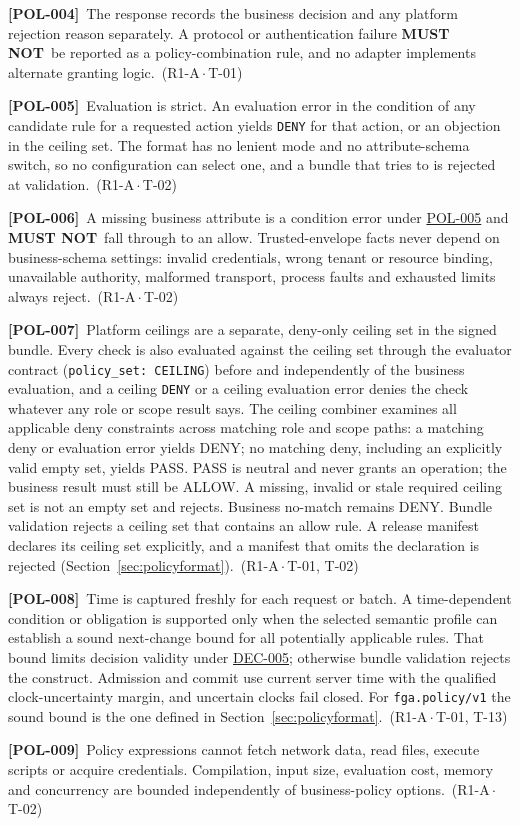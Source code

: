 \documentclass[11pt,a4paper]{article}
\newcommand{\mustnot}{\textbf{MUST NOT}}
\newcommand{\code}[1]{{\small\nolinkurl{#1}}}
\newcommand{\rr}[1]{\hyperlink{req:#1}{#1}}
\newcommand{\reqtag}[2]{{\footnotesize\color{accent}(#1\,$\cdot$\,#2)}}
\newcommand{\req}[4]{\par\noindent\hypertarget{req:#1}{\textbf{[#1]}}\ #4\ \reqtag{#2}{#3}\par}
\begin{document}
\req{POL-004}{R1-A}{T-01}{The response records the business decision and any platform rejection reason separately. A protocol or authentication failure \mustnot\ be reported as a policy-combination rule, and no adapter implements alternate granting logic.}
\req{POL-005}{R1-A}{T-02}{Evaluation is strict. An evaluation error in the condition of any candidate rule for a requested action yields \code{DENY} for that action, or an objection in the ceiling set. The format has no lenient mode and no attribute-schema switch, so no configuration can select one, and a bundle that tries to is rejected at validation.}
\req{POL-006}{R1-A}{T-02}{A missing business attribute is a condition error under \rr{POL-005} and \mustnot\ fall through to an allow. Trusted-envelope facts never depend on business-schema settings: invalid credentials, wrong tenant or resource binding, unavailable authority, malformed transport, process faults and exhausted limits always reject.}
\req{POL-007}{R1-A}{T-01, T-02}{Platform ceilings are a separate, deny-only ceiling set in the signed bundle. Every check is also evaluated against the ceiling set through the evaluator contract (\code{policy_set: CEILING}) before and independently of the business evaluation, and a ceiling \code{DENY} or a ceiling evaluation error denies the check whatever any role or scope result says. The ceiling combiner examines all applicable deny constraints across matching role and scope paths: a matching deny or evaluation error yields DENY; no matching deny, including an explicitly valid empty set, yields PASS. PASS is neutral and never grants an operation; the business result must still be ALLOW. A missing, invalid or stale required ceiling set is not an empty set and rejects. Business no-match remains DENY. Bundle validation rejects a ceiling set that contains an allow rule. A release manifest declares its ceiling set explicitly, and a manifest that omits the declaration is rejected (Section~\ref{sec:policyformat}).}
\req{POL-008}{R1-A}{T-01, T-13}{Time is captured freshly for each request or batch. A time-dependent condition or obligation is supported only when the selected semantic profile can establish a sound next-change bound for all potentially applicable rules. That bound limits decision validity under \rr{DEC-005}; otherwise bundle validation rejects the construct. Admission and commit use current server time with the qualified clock-uncertainty margin, and uncertain clocks fail closed. For \code{fga.policy/v1} the sound bound is the one defined in Section~\ref{sec:policyformat}.}
\req{POL-009}{R1-A}{T-02}{Policy expressions cannot fetch network data, read files, execute scripts or acquire credentials. Compilation, input size, evaluation cost, memory and concurrency are bounded independently of business-policy options.}
\end{document}
